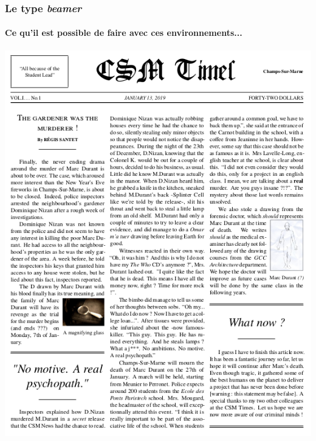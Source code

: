 \documentclass[handout]{beamer}
\begin{document}
\begin{frame}
	\frametitle{Le type \textit{beamer}}
	\framesubtitle{Ce qu'il est possible de faire avec ces environnements...}
	\centering
	\includegraphics[scale=0.25]{Images/Beamer/column.png}
\end{frame}
\end{document}

